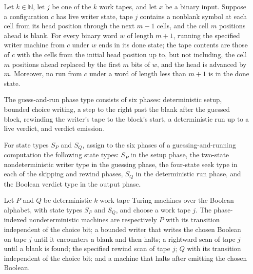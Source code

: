 \begin{theorem}
\label{Turing.ndWriterTM_run_block}
\leanok
{}
Let $k\in\mathbb{N}$, let $j$ be one of the $k$ work tapes, and let $x$ be a binary
input. Suppose a configuration $c$ has live writer state, tape $j$ contains a nonblank
symbol at each cell from its head position through the next $m-1$ cells, and the cell
$m$ positions ahead is blank. For every binary word $w$ of length $m+1$, running the
specified writer machine from $c$ under $w$ ends in its done state; the tape contents
are those of $c$ with the cells from the initial head position up to, but not including,
the cell $m$ positions ahead replaced by the first $m$ bits of $w$, and the head is
advanced by $m$. Moreover, no run from $c$ under a word of length less than $m+1$ is in
the done state.
\end{theorem}

\begin{definition}
\label{Turing.GuessRunPhase}
\leanok
The guess-and-run phase type consists of six phases: deterministic setup, bounded choice
writing, a step to the right past the blank after the guessed block, rewinding the
writer's tape to the block's start, a deterministic run up to a live verdict, and
verdict emission.
\end{definition}

\begin{definition}
\label{Turing.GuessRunPhase.State}
\leanok
{}
For state types $S_P$ and $S_Q$, assign to the six phases of a guessing-and-running
computation the following state types: $S_P$ in the setup phase, the two-state
nondeterministic writer type in the guessing phase, the four-state seek type in each of
the skipping and rewind phases, $S_Q$ in the deterministic run phase, and the Boolean
verdict type in the output phase.
\end{definition}

\begin{definition}
\label{Turing.guessRunPhases}
\leanok
{}
Let $P$ and $Q$ be deterministic $k$-work-tape Turing machines over the Boolean
alphabet, with state types $S_P$ and $S_Q$, and choose a work tape $j$. The
phase-indexed nondeterministic machines are respectively $P$ with its transition
independent of the choice bit; a bounded writer that writes the chosen Boolean on tape
$j$ until it encounters a blank and then halts; a rightward scan of tape $j$ until a
blank is found; the specified rewind scan of tape $j$; $Q$ with its transition
independent of the choice bit; and a machine that halts after emitting the chosen
Boolean.
\end{definition}


